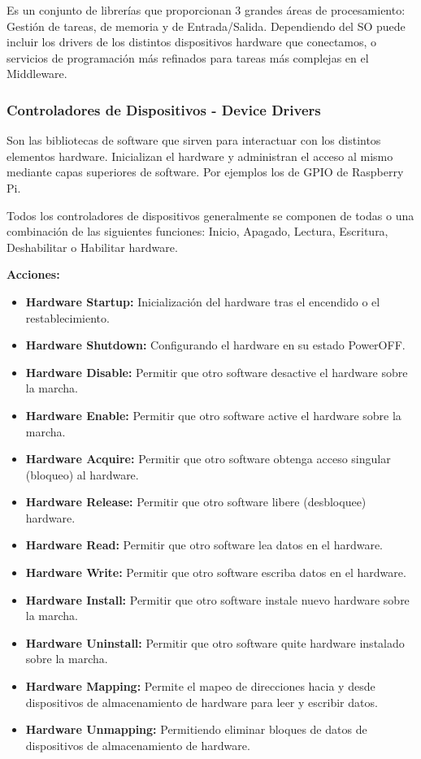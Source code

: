 \documentclass[12pt, twoside, openright]{report} %
\begin{document}
Es un conjunto de librerías que proporcionan 3 grandes áreas de procesamiento: Gestión de tareas, de memoria y de Entrada/Salida. Dependiendo del SO puede incluir los drivers de los distintos dispositivos hardware que conectamos, o servicios de programación más refinados para tareas más complejas en el Middleware.

\subsubsection{Controladores de Dispositivos - Device Drivers}
Son las bibliotecas de software que sirven para interactuar con los distintos elementos hardware. Inicializan el hardware y administran el acceso al mismo mediante capas superiores de software. Por ejemplos los de GPIO de Raspberry Pi.

Todos los controladores de dispositivos generalmente se componen de todas o una combinación de las siguientes funciones: Inicio, Apagado, Lectura, Escritura, Deshabilitar o Habilitar hardware.

\textbf{Acciones:}
\begin{itemize}
	\item \textbf{Hardware Startup:} Inicialización del hardware tras el encendido o el restablecimiento.
	\item \textbf{Hardware Shutdown:} Configurando el hardware en su estado PowerOFF.
	\item \textbf{Hardware Disable:} Permitir que otro software desactive el hardware sobre la marcha.
	\item \textbf{Hardware Enable:} Permitir que otro software active el hardware sobre la marcha.
	\item \textbf{Hardware Acquire:} Permitir que otro software obtenga acceso singular (bloqueo) al hardware.
	\item \textbf{Hardware Release:} Permitir que otro software libere (desbloquee) hardware.
	\item \textbf{Hardware Read:} Permitir que otro software lea datos en el hardware.
	\item \textbf{Hardware Write:} Permitir que otro software escriba datos en el hardware.
	\item \textbf{Hardware Install:} Permitir que otro software instale nuevo hardware sobre la marcha.
	\item \textbf{Hardware Uninstall:} Permitir que otro software quite hardware instalado sobre la marcha.
	\item \textbf{Hardware Mapping:} Permite el mapeo de direcciones hacia y desde dispositivos de almacenamiento de hardware para leer y escribir datos.
	\item \textbf{Hardware Unmapping:} Permitiendo eliminar bloques de datos de dispositivos de almacenamiento de hardware.
\end{itemize}
\end{document}
